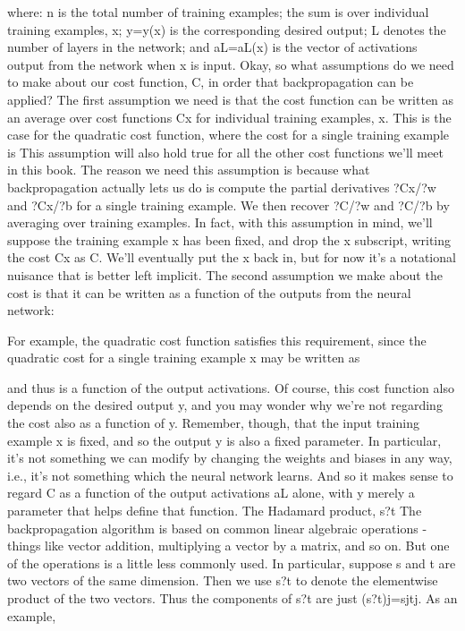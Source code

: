 where: n is the total number of training examples; the sum is over individual training examples, x; y=y(x) is the corresponding desired output; L denotes the number of layers in the network; and aL=aL(x) is the vector of activations output from the network when x is input.
Okay, so what assumptions do we need to make about our cost function, C, in order that backpropagation can be applied? The first assumption we need is that the cost function can be written as an average  over cost functions Cx for individual training examples, x. This is the case for the quadratic cost function, where the cost for a single training example is  This assumption will also hold true for all the other cost functions we'll meet in this book.
The reason we need this assumption is because what backpropagation actually lets us do is compute the partial derivatives ?Cx/?w and ?Cx/?b for a single training example. We then recover ?C/?w and ?C/?b by averaging over training examples. In fact, with this assumption in mind, we'll suppose the training example x has been fixed, and drop the x subscript, writing the cost Cx as C. We'll eventually put the x back in, but for now it's a notational nuisance that is better left implicit.
The second assumption we make about the cost is that it can be written as a function of the outputs from the neural network: 

For example, the quadratic cost function satisfies this requirement, since the quadratic cost for a single training example x may be written as 

and thus is a function of the output activations. Of course, this cost function also depends on the desired output y, and you may wonder why we're not regarding the cost also as a function of y. Remember, though, that the input training example x is fixed, and so the output y is also a fixed parameter. In particular, it's not something we can modify by changing the weights and biases in any way, i.e., it's not something which the neural network learns. And so it makes sense to regard C as a function of the output activations aL alone, with y merely a parameter that helps define that function.
The Hadamard product, s?t
The backpropagation algorithm is based on common linear algebraic operations - things like vector addition, multiplying a vector by a matrix, and so on. But one of the operations is a little less commonly used. In particular, suppose s
and t are two vectors of the same dimension. Then we use s?t to denote the elementwise product of the two vectors. Thus the components of s?t are just (s?t)j=sjtj. As an example, 

